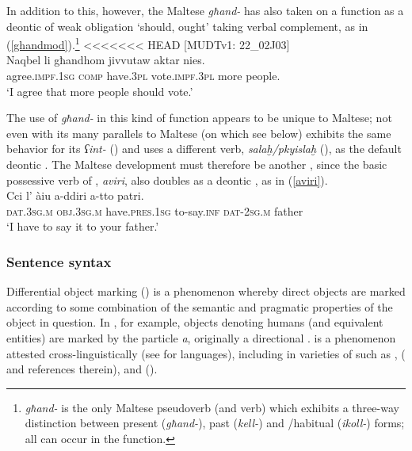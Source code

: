 \documentclass[output=paper]{langsci/langscibook}
\begin{document}
In addition to this, however, the Maltese \textit{għand-} has also taken on a function as a deontic  of weak obligation `should, ought' taking verbal complement, as in (\ref{ghandmod}).\footnote{\textit{għand-} is the only Maltese pseudoverb (and verb) which exhibits a three-way distinction between present (\textit{għand-}), past (\textit{kell-}) and /habitual (\textit{ikoll-}) forms; all can occur in the  function.}
<<<<<<< HEAD
\ea\label{ghandmod}
{[MUDTv1: 22\_02J03]} \\
    \gll Naqbel	li għandhom jivvutaw aktar nies.\\
	agree.\textsc{impf.1sg} \textsc{comp} have.\textsc{3pl} vote.\textsc{impf.3pl} more people.\\
	\glt `I agree that more people should vote.'\\
\z

The use of \textit{għand-} in this kind of  function appears to be unique to Maltese; not even   with its many parallels to Maltese (on which see below) exhibits the same behavior for its  \textit{ʕint-} (\citealt[346]{Borg2004}) and uses a different verb, \textit{salaḫ/pkyislaḫ} (\citealt[323]{Borg2004}), as the default deontic . The Maltese development must therefore be another , since the basic possessive verb of , \textit{aviri}, also doubles as a deontic , as in (\ref{aviri}).
\ea\label{aviri}
    \\
    \gll Cci l' àiu a-ddiri a-tto patri.\\
	\textsc{dat.3sg.m} \textsc{obj.3sg.m} have.\textsc{pres.1sg} to-say.\textsc{inf} \textsc{dat-2sg.m} father\\
	\glt `I have to say it to your father.'\\
\z

\subsubsection{Sentence syntax}
Differential object marking () is a phenomenon whereby direct objects are marked according to some combination of the semantic and pragmatic properties of the object in question. In , for example, objects denoting humans (and equivalent entities) are marked by the particle \textit{a}, originally a directional .  is a phenomenon attested cross-linguistically (see \citealt{Khan1984} for  languages), including in varieties of  such as ,  (\citealt{Coghill2014} and references therein), and  (\citealt[108]{Andalusi2013}).
\end{document}
